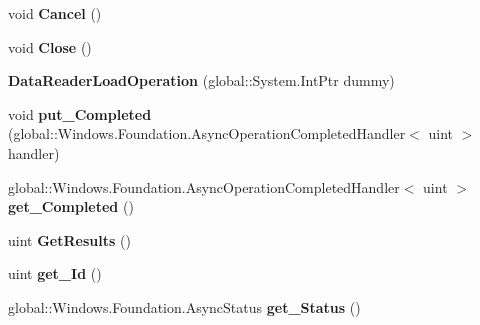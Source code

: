 \begin{DoxyCompactItemize}
void {\bfseries Cancel} ()
\item 
\mbox{\label{class_windows_1_1_storage_1_1_streams_1_1_data_reader_load_operation_a4b0027a73595ac1ed2b96b4c17c64541}} 
void {\bfseries Close} ()
\item 
\mbox{\label{class_windows_1_1_storage_1_1_streams_1_1_data_reader_load_operation_a1bc1b17adae2e272b26f6a612e36b5a9}} 
{\bfseries Data\+Reader\+Load\+Operation} (global\+::\+System.\+Int\+Ptr dummy)
\item 
\mbox{\label{class_windows_1_1_storage_1_1_streams_1_1_data_reader_load_operation_a825056cde4984124d6ba72b348a21927}} 
void {\bfseries put\+\_\+\+Completed} (global\+::\+Windows.\+Foundation.\+Async\+Operation\+Completed\+Handler$<$ uint $>$ handler)
\item 
\mbox{\label{class_windows_1_1_storage_1_1_streams_1_1_data_reader_load_operation_ac568f7677660d25791d132dadf2fa2b8}} 
global\+::\+Windows.\+Foundation.\+Async\+Operation\+Completed\+Handler$<$ uint $>$ {\bfseries get\+\_\+\+Completed} ()
\item 
\mbox{\label{class_windows_1_1_storage_1_1_streams_1_1_data_reader_load_operation_a71f1295140022865ce49695a3490008d}} 
uint {\bfseries Get\+Results} ()
\item 
\mbox{\label{class_windows_1_1_storage_1_1_streams_1_1_data_reader_load_operation_a6ef99092e68b2e93880c4edcaf0fd191}} 
uint {\bfseries get\+\_\+\+Id} ()
\item 
\mbox{\label{class_windows_1_1_storage_1_1_streams_1_1_data_reader_load_operation_a7eee8fde2644e8d129c57b70e838cd7d}} 
global\+::\+Windows.\+Foundation.\+Async\+Status {\bfseries get\+\_\+\+Status} ()
\item 
\mbox{\label{class_windows_1_1_storage_1_1_streams_1_1_data_reader_load_operation_a2c6181e3b5357ed9b288bdf9ac27171d}} 

\end{DoxyCompactItemize}
